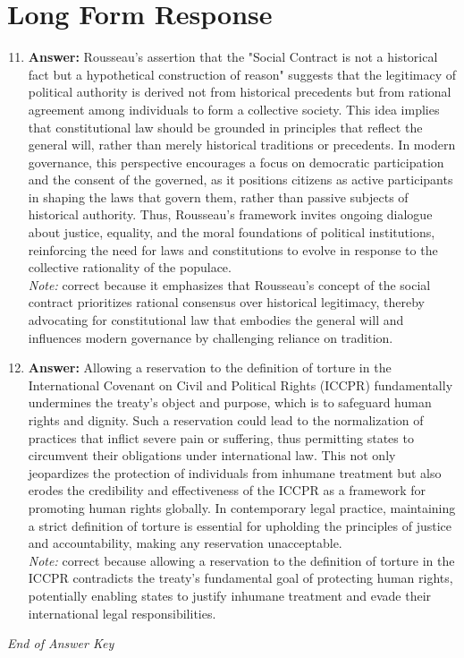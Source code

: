 \documentclass[12pt]{article}
\begin{document}
\section*{Long Form Response}
\begin{enumerate}[label=\arabic*.]
\setcounter{enumi}{10}
\item \textbf{Answer:} Rousseau's assertion that the "Social Contract is not a historical fact but a hypothetical construction of reason" suggests that the legitimacy of political authority is derived not from historical precedents but from rational agreement among individuals to form a collective society. This idea implies that constitutional law should be grounded in principles that reflect the general will, rather than merely historical traditions or precedents. In modern governance, this perspective encourages a focus on democratic participation and the consent of the governed, as it positions citizens as active participants in shaping the laws that govern them, rather than passive subjects of historical authority. Thus, Rousseau's framework invites ongoing dialogue about justice, equality, and the moral foundations of political institutions, reinforcing the need for laws and constitutions to evolve in response to the collective rationality of the populace.
\\ \textit{Note:} correct because it emphasizes that Rousseau's concept of the social contract prioritizes rational consensus over historical legitimacy, thereby advocating for constitutional law that embodies the general will and influences modern governance by challenging reliance on tradition.
\item \textbf{Answer:} Allowing a reservation to the definition of torture in the International Covenant on Civil and Political Rights (ICCPR) fundamentally undermines the treaty's object and purpose, which is to safeguard human rights and dignity. Such a reservation could lead to the normalization of practices that inflict severe pain or suffering, thus permitting states to circumvent their obligations under international law. This not only jeopardizes the protection of individuals from inhumane treatment but also erodes the credibility and effectiveness of the ICCPR as a framework for promoting human rights globally. In contemporary legal practice, maintaining a strict definition of torture is essential for upholding the principles of justice and accountability, making any reservation unacceptable.
\\ \textit{Note:} correct because allowing a reservation to the definition of torture in the ICCPR contradicts the treaty's fundamental goal of protecting human rights, potentially enabling states to justify inhumane treatment and evade their international legal responsibilities.
\end{enumerate}

\vfill
\noindent\textit{End of Answer Key}
\end{document}
